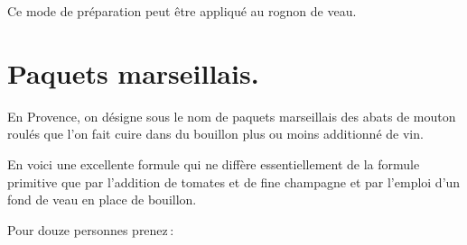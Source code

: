 Ce mode de préparation peut être appliqué au rognon de veau.

\section*{\centering Paquets marseillais.}
{}

En Provence, on désigne sous le nom de paquets marseillais des abats de mouton
roulés que l'on fait cuire dans du bouillon plus ou moins additionné de vin.

En voici une excellente formule qui ne diffère essentiellement de la formule
primitive que par l'addition de tomates et de fine champagne et par l'emploi d'un
fond de veau en place de bouillon.

\medskip

Pour douze personnes prenez :

\medskip

